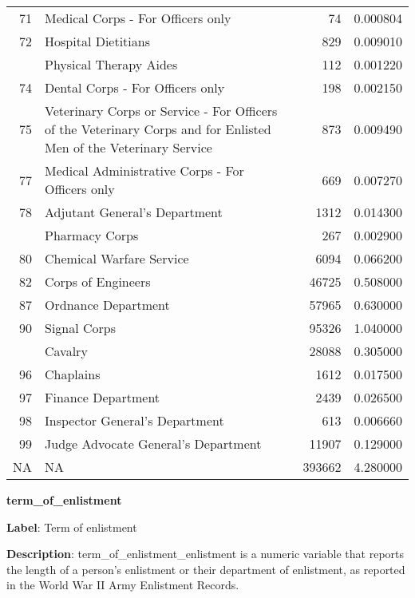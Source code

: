 \documentclass[
]{article}
\begin{document}
\begin{table}
\begin{tabular}{r>{\raggedright\arraybackslash}p{9cm}rr}
71 & Medical Corps - For Officers only & 74 & 0.000804\\
72 & Hospital Dietitians & 829 & 0.009010\\
\addlinespace
73 & Physical Therapy Aides & 112 & 0.001220\\
74 & Dental Corps - For Officers only & 198 & 0.002150\\
75 & Veterinary Corps or Service - For Officers of the Veterinary Corps and for Enlisted Men of the Veterinary Service & 873 & 0.009490\\
77 & Medical Administrative Corps - For Officers only & 669 & 0.007270\\
78 & Adjutant General's Department & 1312 & 0.014300\\
\addlinespace
79 & Pharmacy Corps & 267 & 0.002900\\
80 & Chemical Warfare Service & 6094 & 0.066200\\
82 & Corps of Engineers & 46725 & 0.508000\\
87 & Ordnance Department & 57965 & 0.630000\\
90 & Signal Corps & 95326 & 1.040000\\
\addlinespace
93 & Cavalry & 28088 & 0.305000\\
96 & Chaplains & 1612 & 0.017500\\
97 & Finance Department & 2439 & 0.026500\\
98 & Inspector General's Department & 613 & 0.006660\\
99 & Judge Advocate General's Department & 11907 & 0.129000\\
\addlinespace
NA & NA & 393662 & 4.280000\\
\bottomrule
\end{tabular}
\end{table}

\newpage

\textbf{\huge term\_of\_enlistment} \normalsize \vspace{12pt}

\textbf{Label}: Term of enlistment

\textbf{Description}: term\_of\_enlistment\_enlistment is a numeric
variable that reports the length of a person's enlistment or their
department of enlistment, as reported in the World War II Army
Enlistment Records.

\vspace{30 pt}
\end{document}
